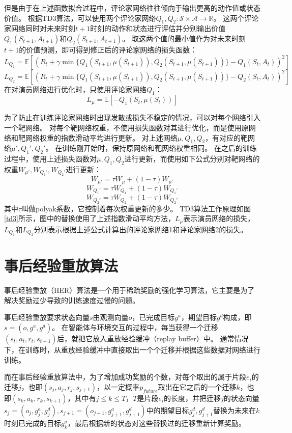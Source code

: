     但是由于在上述函数拟合过程中，评论家网络往往倾向于输出更高的动作值或状态价值。
    根据TD3算法\cite{DBLP:journals/corr/abs-1802-09477}，可以使用两个评论家网络$Q_1,Q_2:\mathcal S\times\mathcal A\to \mathbb R$。
    这两个评论家网络同时对未来时刻$t+1$时刻的动作和状态进行评估并分别输出价值$Q_1(S_{t+1},A_{t+1})$和$Q_2(S_{t+1},A_{t+1})$。
    取这两个值的最小值作为对未来时刻$t+1$的价值预测，即可得到修正后的评论家网络的损失函数：
    $$L_{Q_1} = \mathbb E[(R_t + \gamma \min\{ Q_1(S_{t+1},\mu(S_{t+1})), Q_2(S_{t+1},\mu(S_{t+1})) \} - Q_1(S_t, A_t))^2]$$
    $$L_{Q_2} = \mathbb E[(R_t + \gamma \min\{ Q_1(S_{t+1},\mu(S_{t+1})), Q_2(S_{t+1},\mu(S_{t+1})) \} - Q_2(S_t, A_t))^2]$$
    在对演员网络进行优化时，只使用评论家网络$Q_1$：
    $$L_\mu = \mathbb E[-Q_1(S_t, \mu(S_t))]$$

    为了防止在训练评论家网络时出现发散或损失不稳定的情况，可以对每个网络引入一个靶网络。
    对每个靶网络权重，不使用损失函数对其进行优化，而是使用原网络和靶网络权重的指数滑动平均进行更新。
    对上述网络$\mu, Q_1, Q_2$，有对应的靶网络$\mu',Q_1',Q_2'$。
    在训练刚开始时，保持原网络和靶网络权重相同。
    在之后的训练过程中，使用上述损失函数对$\mu, Q_1, Q_2$进行更新，而使用如下公式分别对靶网络的权重$W_{\mu'},W_{Q_1'}, W_{Q_2'}$进行更新：
    $$W_{\mu'} = \tau W_\mu + (1-\tau) W_{\mu'}$$
    $$W_{Q_1'} = \tau W_{Q_1} + (1-\tau) W_{Q_1'}$$
    $$W_{Q_2'} = \tau W_{Q_2} + (1-\tau) W_{Q_2'}$$
    其中$\tau$叫做polyak系数，它控制着每次权重更新的多少。
    TD3算法工作原理如图\ref{td3}所示，图中的替换使用了上述指数滑动平均方法，$L_\mu$表示演员网络的损失，$L_{Q_1}$和$L_{Q_2}$分别表示根据上述公式计算出的评论家网络1和评论家网络2的损失。
    

    \section{事后经验重放算法}
    事后经验重放（HER）算法\cite{DBLP:journals/corr/AndrychowiczWRS17}是一个用于稀疏奖励的强化学习算法，它主要是为了解决奖励过少导致的训练速度过慢的问题。
    
    事后经验重放要求状态向量$s$由观测向量$o$，已完成目标$g^a$，期望目标$g^d$构成，即$s=(o, g^a, g^d)$。
    在智能体与环境交互的过程中，每当获得一个迁移$(s_t, a_t, r_t, s_{t+1})$后，就把它放入重放经验缓冲（replay buffer）中。
    通常情况下，在训练时，从重放经验缓冲中直接取出一个个迁移并根据这些数据对网络进行训练。

    而在事后经验重放算法中，为了增加成功奖励的个数，对每个取出的属于片段$e_i$的迁移$j$，也即$(s_j, a_j, r_j, s_{j+1})$，以一定概率$p_{future}$取出在它之后的一个迁移$k$，也即$(s_k, a_k, r_k, s_{k+1})$，其中有$j\leq k\leq T$，$T$是片段$e_i$的长度，并把迁移$j$的状态向量$s_j=(o_j,g^a_j, g^d_j), s_{j+1}=(o_{j+1},g^a_{j+1}, g^d_{j+1})$中的期望目标$g^d_{j}, g^d_{j+1}$替换为未来在$k$时刻已完成的目标$g^a_{k}$，最后根据新的状态对这些替换过的迁移重新计算奖励。

